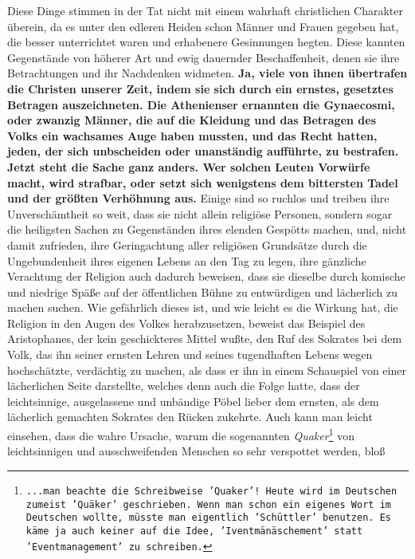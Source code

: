 {Diese Dinge stimmen in der Tat nicht mit einem wahrhaft christlichen Charakter
überein, da es unter den edleren Heiden schon Männer und
Frauen gegeben hat, die
besser unterrichtet waren und erhabenere Gesinnungen hegten. Diese kannten
Gegenstände von höherer Art und ewig dauernder Beschaffenheit, denen sie ihre
Betrachtungen und ihr Nachdenken widmeten. 
\label{ref:17_08_sittenwaechter}
\textbf{Ja, viele von ihnen übertrafen die
Christen unserer Zeit, indem sie sich durch ein ernstes, gesetztes Betragen
auszeichneten. Die Athenienser ernannten die Gynaecosmi, oder zwanzig Männer,
die auf die Kleidung und das Betragen des Volks ein wachsames Auge haben
mussten,
und das Recht hatten, jeden, der sich unbscheiden oder unanständig aufführte,
zu bestrafen. Jetzt steht die Sache ganz anders. Wer solchen Leuten
Vorwürfe macht, wird strafbar, oder setzt sich wenigstens dem bittersten Tadel
und der größten Verhöhnung aus.} Einige sind so ruchlos und treiben ihre
Unverschämtheit so weit, dass sie nicht allein religiöse Personen, sondern sogar
die heiligsten Sachen zu Gegenständen ihres elenden Gespötts machen, und, nicht
damit zufrieden, ihre Geringachtung aller religiösen Grundsätze durch die
Ungebundenheit ihres eigenen Lebens an den Tag zu legen, ihre gänzliche
Verachtung der Religion auch dadurch beweisen, dass sie dieselbe durch komische
und niedrige Späße auf der öffentlichen Bühne zu entwürdigen und lächerlich zu
machen suchen. Wie gefährlich dieses ist, und wie leicht es die Wirkung hat, die
Religion in den Augen des Volkes herabzusetzen, beweist das Beispiel des
Aristophanes, der kein geschickteres Mittel wußte,
den Ruf des Sokrates bei dem
Volk, das ihn seiner ernsten Lehren und seines tugendhaften Lebens wegen
hochschätzte, verdächtig zu machen, als dass er ihn in einem Schauspiel von
einer lächerlichen Seite darstellte, welches denn auch die Folge hatte, dass der
leichtsinnige, ausgelassene und unbändige Pöbel lieber
dem ernsten, als dem
lächerlich gemachten Sokrates den Rücken zukehrte. Auch kann man leicht
einsehen, dass die wahre Ursache, warum die sogenannten
\textit{Quaker}\footnote{\texttt{...man beachte die Schreibweise
'Quaker'! Heute wird im Deutschen zumeist 'Quäker' geschrieben. Wenn man schon
ein eigenes
Wort im Deutschen wollte, müsste man eigentlich 'Schüttler' benutzen. Es käme ja
auch
keiner auf die Idee, 'Iventmänäschement' statt 'Eventmanagement' zu
schreiben.}} von
leichtsinnigen und ausschweifenden Menschen so sehr verspottet werden, bloß
}
